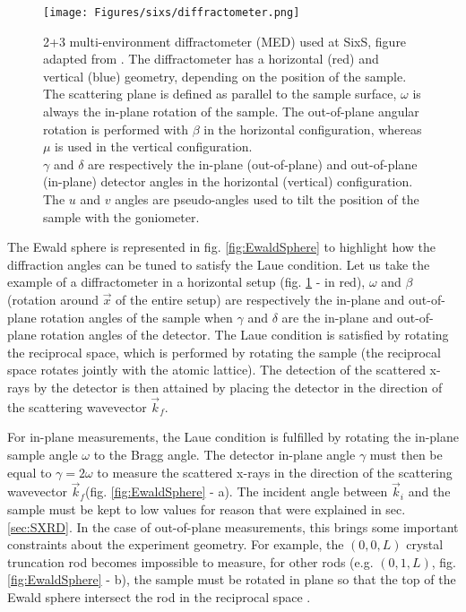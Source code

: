 \begin{figure}[!htb]
    \centering
    \texttt{[image: Figures/sixs/diffractometer.png]}
    \caption{
    2+3 multi-environment diffractometer (MED) used at SixS, figure adapted from \cite{Schleputz2011}.
    The diffractometer has a horizontal (red) and vertical (blue) geometry, depending on the position of the sample.\\
    The scattering plane is defined as parallel to the sample surface, $\omega$ is always the in-plane rotation of the sample.
    The out-of-plane angular rotation is performed with $\beta$ in the horizontal configuration, whereas $\mu$ is used in the vertical configuration.\\
    $\gamma$ and $\delta$ are respectively the in-plane (out-of-plane) and out-of-plane (in-plane) detector angles in the horizontal (vertical) configuration.\\
    The $u$ and $v$ angles are pseudo-angles used to tilt the position of the sample with the goniometer.
    }
    \label{fig:Diffractometer}
\end{figure}

The Ewald sphere is represented in fig. \ref{fig:EwaldSphere} to highlight how the diffraction angles can be tuned to satisfy the Laue condition.
Let us take the example of a diffractometer in a horizontal setup (fig. \ref{fig:Diffractometer} - in red), $\omega$ and $\beta$ (rotation around $\vec{x}$ of the entire setup) are respectively the in-plane and out-of-plane rotation angles of the sample when $\gamma$ and $\delta$ are the in-plane and out-of-plane rotation angles of the detector.
The Laue condition is satisfied by rotating the reciprocal space, which is performed by rotating the sample (the reciprocal space rotates jointly with the atomic lattice).
The detection of the scattered x-rays by the detector is then attained by placing the detector in the direction of the scattering wavevector $\vec{k}_f$.

For in-plane measurements, the Laue condition is fulfilled by rotating the in-plane sample angle $\omega$ to the Bragg angle.
The detector in-plane angle $\gamma$ must then be equal to $\gamma = 2 \omega$ to measure the scattered x-rays in the direction of the scattering wavevector $\vec{k}_f$(fig. \ref{fig:EwaldSphere} - a).
The incident angle between $\vec{k}_i$ and the sample must be kept to low values for reason that were explained in sec. \ref{sec:SXRD}.
In the case of out-of-plane measurements, this brings some important constraints about the experiment geometry.
For example, the $(0, 0, L)$ crystal truncation rod becomes impossible to measure, for other rods (e.g. $(0, 1, L)$, fig. \ref{fig:EwaldSphere} - b), the sample must be rotated in plane so that the top of the Ewald sphere intersect the rod in the reciprocal space \parencite{Vlieg1997, Schleputz2005}.

